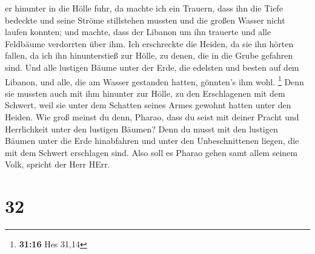 er hinunter in die Hölle fuhr, da machte ich ein Trauern, dass ihn die
Tiefe bedeckte und seine Ströme stillstehen mussten und die großen
Wasser nicht laufen konnten; und machte, dass der Libanon um ihn
trauerte und alle Feldbäume verdorrten über ihm.  Ich
erschreckte die Heiden, da sie ihn hörten fallen, da ich ihn
hinunterstieß zur Hölle, zu denen, die in die Grube gefahren sind. Und
alle lustigen Bäume unter der Erde, die edelsten und besten auf dem
Libanon, und alle, die am Wasser gestanden hatten, gönnten's ihm wohl.
\footnote{\textbf{31:16} Hes 31,14}  Denn sie mussten
auch mit ihm hinunter zur Hölle, zu den Erschlagenen mit dem Schwert,
weil sie unter dem Schatten seines Armes gewohnt hatten unter den
Heiden.  Wie groß meinst du denn, Pharao, dass du seist
mit deiner Pracht und Herrlichkeit unter den lustigen Bäumen? Denn du
musst mit den lustigen Bäumen unter die Erde hinabfahren und unter den
Unbeschnittenen liegen, die mit dem Schwert erschlagen sind. Also soll
es Pharao gehen samt allem seinem Volk, spricht der Herr HErr.

\hypertarget{section-31}{%
\section{32}\label{section-31}}

